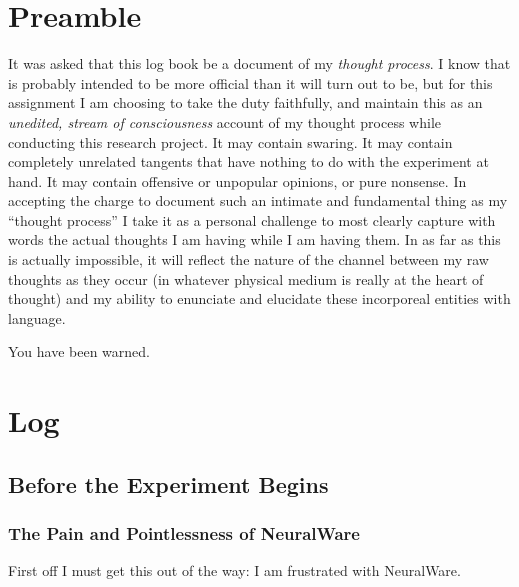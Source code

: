 \documentclass[12pt]{article}
\begin{document}
\maketitle

\section{Preamble}

It was asked that this log book be a document of my \emph{thought process}.  I know that is probably intended to be more official than it will turn out to be, but for this assignment I am choosing to take the duty faithfully, and maintain this as an \emph{unedited, stream of consciousness} account of my thought process while conducting this research project.  It may contain swaring.  It may contain completely unrelated tangents that have nothing to do with the experiment at hand.  It may contain offensive or unpopular opinions, or pure nonsense.  In accepting the charge to document such an intimate and fundamental thing as my ``thought process'' I take it as a personal challenge to most clearly capture with words the actual thoughts I am having while I am having them.  In as far as this is actually impossible, it will reflect the nature of the channel between my raw thoughts as they occur (in whatever physical medium is really at the heart of thought) and my ability to enunciate and elucidate these incorporeal entities with language.  

You have been warned.

\section{Log}

\subsection{Before the Experiment Begins}

\subsubsection{The Pain and Pointlessness of NeuralWare}

First off I must get this out of the way: I am frustrated with NeuralWare.  
\end{document}
